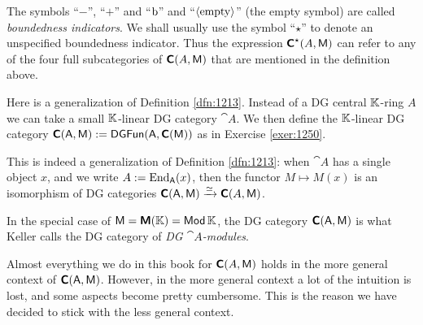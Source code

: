 The symbols ``$-$'', ``$+$'' and ``$\mathrm{b}$'' and 
``$\langle \mathrm{empty} \rangle$'' (the empty symbol) are called {\em boundedness 
indicators}. We shall usually use the symbol ``$\star$'' to denote an 
unspecified boundedness indicator. Thus the expression 
$\boldsymbol{\mathsf{C}}^{\star}(A, \operatorname{\mathsf{M}})$ can refer to any of the four full subcategories 
of $\boldsymbol{\mathsf{C}}(A, \operatorname{\mathsf{M}})$ that are mentioned in the definition above.

\begin{rem} \label{rem:1245}
Here is a generalization of Definition \ref{dfn:1213}. Instead of a DG central
$\mathbb{K}$-ring $A$ we can take a small $\mathbb{K}$-linear DG category $\cat{A}$. 
We then define the $\mathbb{K}$-linear DG category 
$\boldsymbol{\mathsf{C}}(\operatorname{\mathsf{A}}, \operatorname{\mathsf{M}}) := \operatorname{\mathsf{DGFun}}(\operatorname{\mathsf{A}}, \boldsymbol{\mathsf{C}}(\operatorname{\mathsf{M}}))$
as in Exercise \ref{exer:1250}.

This is indeed a generalization of Definition \ref{dfn:1213}: when $\cat{A}$ 
has a single object $x$, and we write $A := \operatorname{End}_{\operatorname{\mathsf{A}}}(x)$, then 
the functor $M \mapsto M(x)$ is an isomorphism of DG categories
$\boldsymbol{\mathsf{C}}(\operatorname{\mathsf{A}}, \operatorname{\mathsf{M}}) \xrightarrow{\simeq} \boldsymbol{\mathsf{C}}(A, \operatorname{\mathsf{M}})$. 

In the special case of $\operatorname{\mathsf{M}} = \boldsymbol{\mathsf{M}}(\mathbb{K}) = \operatorname{\mathsf{Mod}} \mathbb{K}$, the DG category 
$\boldsymbol{\mathsf{C}}(\operatorname{\mathsf{A}}, \operatorname{\mathsf{M}})$ is what Keller \cite{Kel1} calls the DG category 
of {\em DG $\cat{A}$-modules}. 

Almost everything we do in this book for $\boldsymbol{\mathsf{C}}(A, \operatorname{\mathsf{M}})$
holds in the more general context of $\boldsymbol{\mathsf{C}}(\operatorname{\mathsf{A}}, \operatorname{\mathsf{M}})$.
However, in the more general context a lot of the intuition is lost, and some 
aspects become pretty cumbersome. This is the reason we have decided to stick 
with the less general context. 
\end{rem}

